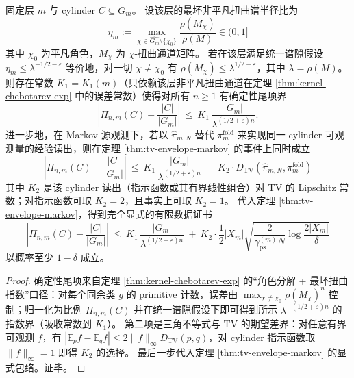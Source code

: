 \begin{theorem}\label{thm:auditable-profinite-chebotarev-finite}
固定层 \(m\) 与 cylinder \(C\subseteq G_m\)。
设该层的最坏非平凡扭曲谱半径比为
\[
\eta_m:=\max_{\chi\in\widehat{G_m}\setminus\{\chi_0\}}\frac{\rho(M_\chi)}{\rho(M)}\in(0,1]
\]
其中 \(\chi_0\) 为平凡角色，\(M_\chi\) 为 \(\chi\)-扭曲通道矩阵。
若在该层满足统一谱隙假设
\(
\eta_m\le \lambda^{-1/2-\varepsilon}
\)
等价地，对一切 \(\chi\ne\chi_0\) 有 \(\rho(M_\chi)\le \lambda^{1/2-\varepsilon}\)，其中 \(\lambda=\rho(M)\)。
则存在常数 \(K_1=K_1(m)\)（只依赖该层非平凡扭曲通道在定理 \ref{thm:kernel-chebotarev-exp} 中的误差常数）使得对所有 \(n\ge 1\) 有确定性尾项界
\[
\left|\Pi_{n,m}(C)-\frac{|C|}{|G_m|}\right|
\ \le\
K_1\,\frac{|G_m|}{\lambda^{(1/2+\varepsilon)n}}.
\]
进一步地，在 Markov 源观测下，若以 \(\hat{\pi}_{m,N}\) 替代 \(\pi_m^{\mathrm{fold}}\) 来实现同一 cylinder 可观测量的经验读出，则在定理 \ref{thm:tv-envelope-markov} 的事件上同时成立
\[
\boxed{\;
\left|\Pi_{n,m}(C)-\frac{|C|}{|G_m|}\right|
\ \le\
K_1\,\frac{|G_m|}{\lambda^{(1/2+\varepsilon)n}}
\ +\
K_2\cdot D_{\mathrm{TV}}(\hat{\pi}_{m,N},\pi_m^{\mathrm{fold}})
\;}
\]
其中 \(K_2\) 是该 cylinder 读出（指示函数或其有界线性组合）对 TV 的 Lipschitz 常数；对指示函数可取 \(K_2=2\)，且事实上可取 \(K_2=1\)。
代入定理 \ref{thm:tv-envelope-markov}，得到完全显式的有限数据证书
\[
\boxed{\;
\left|\Pi_{n,m}(C)-\frac{|C|}{|G_m|}\right|
\ \le\
K_1\,\frac{|G_m|}{\lambda^{(1/2+\varepsilon)n}}
\ +\
K_2\cdot \frac12|X_m|\sqrt{\frac{2}{\gamma_{\mathrm{ps}}^{(m)}N}\log\frac{2|X_m|}{\delta}}
\;}
\]
以概率至少 \(1-\delta\) 成立。
\end{theorem}

\begin{proof}
确定性尾项来自定理 \ref{thm:kernel-chebotarev-exp} 的“角色分解 + 最坏扭曲指数”口径：对每个同余类 \(g\) 的 primitive 计数，误差由 \(\max_{\chi\ne\chi_0}\rho(M_\chi)^n\) 控制；归一化为比例 \(\Pi_{n,m}(C)\) 并在统一谱隙假设下即可得到所示 \(\lambda^{-(1/2+\varepsilon)n}\) 的指数界（吸收常数到 \(K_1\)）。
第二项是三角不等式与 TV 的期望差界：对任意有界可观测 \(f\)，有 \(|\mathbb{E}_p f-\mathbb{E}_q f|\le 2\|f\|_\infty D_{\mathrm{TV}}(p,q)\)，对 cylinder 指示函数取 \(\|f\|_\infty=1\) 即得 \(K_2\) 的选择。
最后一步代入定理 \ref{thm:tv-envelope-markov} 的显式包络。证毕。
\end{proof}

